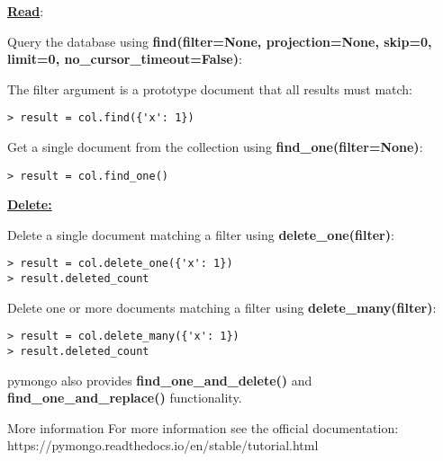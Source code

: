 \documentclass{beamer}[10pt, usepdftitle=false handout]
\begin{document}
\begin{frame}[fragile]

\underline{\textbf{Read}}:
\vspace*{0.6em}

Query the database using \textbf{find(filter=None, projection=None, skip=0, limit=0, no\_cursor\_timeout=False)}: 
\vspace*{0.6em}

The filter argument is a prototype document that all results must match:
\begin{verbatim}
> result = col.find({'x': 1})
\end{verbatim}
 
Get a single document from the collection using \textbf{find\_one(filter=None)}:
\begin{verbatim}
> result = col.find_one()
\end{verbatim}

\end{frame}
\begin{frame}[fragile]
\underline{\textbf{Delete:}}

Delete a single document matching a filter using \textbf{delete\_one(filter)}:
\vspace*{0.6em}

\begin{verbatim}
> result = col.delete_one({'x': 1})
> result.deleted_count
\end{verbatim}

Delete one or more documents matching a filter using \textbf{delete\_many(filter)}:
\begin{verbatim}
> result = col.delete_many({'x': 1})
> result.deleted_count
\end{verbatim}

pymongo also provides \textbf{find\_one\_and\_delete()} and \textbf{find\_one\_and\_replace()} functionality.
\vspace*{0.6em}

\begin{block}{More information}
For more information see the official documentation: 
https://pymongo.readthedocs.io/en/stable/tutorial.html
\end{block}
\end{frame}
\end{document}
